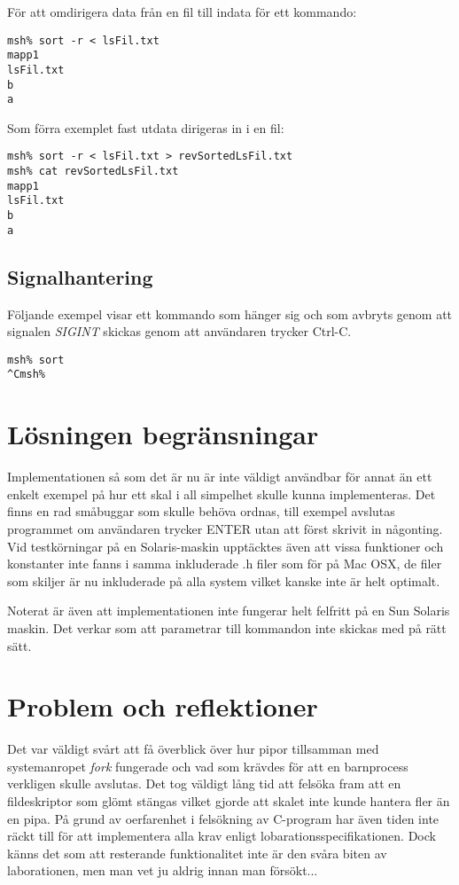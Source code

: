 \documentclass[a4paper, 12pt]{article}
\begin{document}
För att omdirigera data från en fil till indata för ett kommando:
\begin{scriptsize}
\begin{verbatim}
msh% sort -r < lsFil.txt
mapp1
lsFil.txt
b
a
\end{verbatim}
\end{scriptsize}

Som förra exemplet fast utdata dirigeras in i en fil:
\begin{scriptsize}
\begin{verbatim}
msh% sort -r < lsFil.txt > revSortedLsFil.txt
msh% cat revSortedLsFil.txt
mapp1
lsFil.txt
b
a
\end{verbatim}
\end{scriptsize}

\subsection{Signalhantering}\label{sec:signalhantering}
Följande exempel visar ett kommando som hänger sig och som avbryts
genom att signalen \textit{SIGINT} skickas genom att användaren
trycker Ctrl-C.
\begin{scriptsize}
\begin{verbatim}
msh% sort
^Cmsh% 
\end{verbatim}
\end{scriptsize}

\section{Lösningen begränsningar}\label{sec:losningensbegransningar}
Implementationen så som det är nu är inte väldigt användbar för annat
än ett enkelt exempel på hur ett skal i all simpelhet skulle kunna
implementeras. Det finns en rad småbuggar som skulle behöva ordnas,
till exempel avslutas programmet om användaren trycker ENTER utan att
först skrivit in någonting. Vid testkörningar på en Solaris-maskin
upptäcktes även att vissa funktioner och konstanter inte fanns i samma
inkluderade .h filer som för på Mac OSX, de filer som skiljer är
nu inkluderade på alla system vilket kanske inte är helt optimalt.

Noterat är även att implementationen inte fungerar helt felfritt på en
Sun Solaris maskin. Det verkar som att parametrar till kommandon inte
skickas med på rätt sätt.

\section{Problem och reflektioner}\label{sec:problemochreflektioner}
Det var väldigt svårt att få överblick över hur pipor tillsamman med
systemanropet \textit{fork} fungerade och vad som krävdes för att en
barnprocess verkligen skulle avslutas. Det tog väldigt lång tid att
felsöka fram att en fildeskriptor som glömt stängas vilket gjorde att
skalet inte kunde hantera fler än en pipa. På grund av oerfarenhet i
felsökning av C-program har även tiden inte räckt till för att
implementera alla krav enligt lobarationsspecifikationen. Dock känns
det som att resterande funktionalitet inte är den svåra biten av
laborationen, men man vet ju aldrig innan man försökt...
\end{document}
